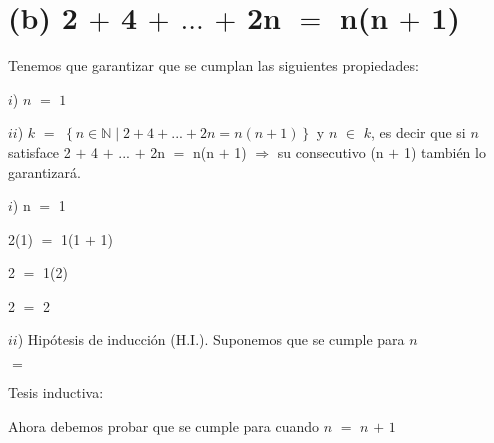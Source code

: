 \documentclass[12pt]{article}
\newenvironment{MyColorPar}[1]{%
    \leavevmode\color{#1}\ignorespaces%
}{%
}%
\begin{document}
\section*{(b) 2 $+$ 4 $+$ $...$ $+$ 2n $=$ n(n $+$ 1) } 

 \begin{MyColorPar}{Boston Blue}
 
 Tenemos que garantizar que se cumplan las siguientes propiedades: 
 
\end{MyColorPar} \vspace{0.2cm}

 \begin{MyColorPar}{verde_manzana}
 $i$) $n$ $=$ $1$
 
 $ii$) $k$ $=$ $\left\{n \in \mathbb{N} \mid 2 + 4 + ... + 2n = n(n + 1) \right\}$ y $n$ $\in$ $k$, es decir que si $n$ satisface 2 $+$ 4 $+$ $...$ $+$ 2n $=$ n(n $+$ 1) \hspace{0.2cm} $\Longrightarrow$ \hspace{0.2cm} su consecutivo (n $+$ 1) también lo garantizará.
 \end{MyColorPar} \vspace{0.2cm}
 
 \newpage
 
{\textcolor{verde_manzana}{$i$)  n $=$ 1}} \vspace{0.2cm}

\hspace{4cm} 2(1) $=$ 1(1 $+$ 1) \vspace{0.2cm}

\hspace{4.6cm} 2 $=$ 1(2) \vspace{0.2cm}

\hspace{4.6cm} 2 $=$ 2 \vspace{0.2cm}

{\textcolor{verde_manzana}{$ii$) Hipótesis de inducción (H.I.). }} Suponemos que se cumple para $n$\vspace{0.2cm} 
 
\hspace{4cm} {} $=$  {} \vspace{0.2cm}
 
{\textcolor{verde_manzana}{Tesis inductiva:}}  \vspace{0.2cm}
 
Ahora debemos probar que se cumple para cuando $n$ $=$ $n$ $+$ $1$ \vspace{0.2cm}
 
\end{document}
